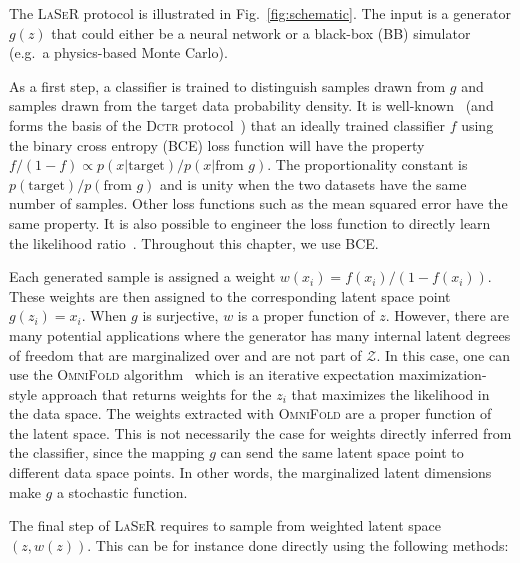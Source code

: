 The \textsc{LaSeR} protocol is illustrated in Fig.~\ref{fig:schematic}. The input is a generator $g(z)$ that could either be a neural network or a black-box (BB) simulator (e.g.\ a physics-based Monte Carlo).

As a first step, a classifier is trained to distinguish samples drawn from $g$ and samples drawn from the target data probability density. It is well-known~\cite{hastie01statisticallearning,sugiyama_suzuki_kanamori_2012} (and forms the basis of the \textsc{Dctr} protocol~\cite{1907.08209}) that an ideally trained classifier $f$ using the binary cross entropy (BCE) loss function will have the property $f/(1-f)\propto p(x|\text{target})/p(x|\text{from $g$})$. The proportionality constant is $p(\text{target})/p(\text{from $g$})$ and is unity when the two datasets have the same number of samples. Other loss functions such as the mean squared error have the same property. It is also possible to engineer the loss function to directly learn the likelihood ratio~\cite{DAgnolo:2018cun,Nachman:2021yvi}. Throughout this chapter, we use BCE.

Each generated sample is assigned a weight $w(x_i)=f(x_i)/(1-f(x_i))$. These weights are then assigned to the corresponding latent space point $g(z_i)=x_i$. When $g$ is surjective, $w$ is a proper function of $z$. However, there are many potential applications where the generator has many internal latent degrees of freedom that are marginalized over and are not part of $\mathcal{Z}$. In this case, one can use the \textsc{OmniFold} algorithm~\cite{Andreassen:2019cjw} which is an iterative expectation maximization-style approach that returns weights for the $z_i$ that maximizes the likelihood in the data space.  The weights extracted with \textsc{OmniFold} are a proper function of the latent space. This is not necessarily the case for weights directly inferred from the classifier, since the mapping $g$ can send the same latent space point to different data space points. In other words, the marginalized latent dimensions make $g$ a stochastic function.


The final step of \textsc{LaSeR} requires to sample from weighted latent space $(z,w(z))$. This can be for instance done directly using the following methods:

